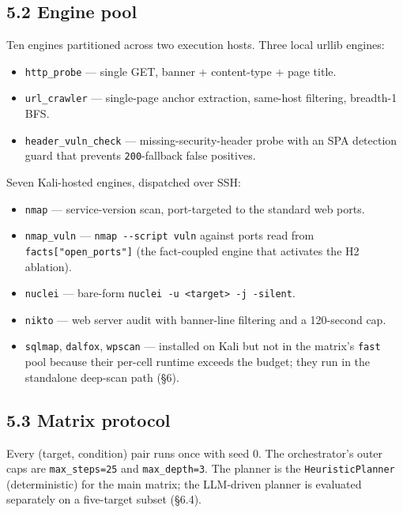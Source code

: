 \documentclass[
]{article}
\providecommand{\tightlist}{%
  \setlength{\itemsep}{0pt}\setlength{\parskip}{0pt}}
\begin{document}
\subsection{5.2 Engine pool}\label{engine-pool}

Ten engines partitioned across two execution hosts. Three local urllib
engines:

\begin{itemize}
\tightlist
\item
  \texttt{http\_probe} --- single GET, banner + content-type + page
  title.
\item
  \texttt{url\_crawler} --- single-page anchor extraction, same-host
  filtering, breadth-1 BFS.
\item
  \texttt{header\_vuln\_check} --- missing-security-header probe with an
  SPA detection guard that prevents \texttt{200}-fallback false
  positives.
\end{itemize}

Seven Kali-hosted engines, dispatched over SSH:

\begin{itemize}
\tightlist
\item
  \texttt{nmap} --- service-version scan, port-targeted to the standard
  web ports.
\item
  \texttt{nmap\_vuln} --- \texttt{nmap\ -\/-script\ vuln} against ports
  read from \texttt{facts{[}"open\_ports"{]}} (the fact-coupled engine
  that activates the H2 ablation).
\item
  \texttt{nuclei} --- bare-form
  \texttt{nuclei\ -u\ \textless{}target\textgreater{}\ -j\ -silent}.
\item
  \texttt{nikto} --- web server audit with banner-line filtering and a
  120-second cap.
\item
  \texttt{sqlmap}, \texttt{dalfox}, \texttt{wpscan} --- installed on
  Kali but not in the matrix's \texttt{fast} pool because their per-cell
  runtime exceeds the budget; they run in the standalone deep-scan path
  (§6).
\end{itemize}

\subsection{5.3 Matrix protocol}\label{matrix-protocol}

Every (target, condition) pair runs once with seed 0. The orchestrator's
outer caps are \texttt{max\_steps=25} and \texttt{max\_depth=3}. The
planner is the \texttt{HeuristicPlanner} (deterministic) for the main
matrix; the LLM-driven planner is evaluated separately on a five-target
subset (§6.4).
\end{document}
